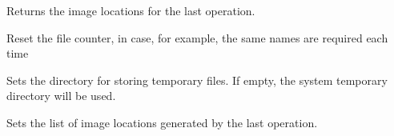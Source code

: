 \label{wxrichtexthtmlhandlergettemporaryimagelocations}


Returns the image locations for the last operation.

\label{wxrichtexthtmlhandlersetfilecounter}


Reset the file counter, in case, for example, the same names are required each time

\label{wxrichtexthtmlhandlersettempdir}


Sets the directory for storing temporary files. If empty, the system
temporary directory will be used.

\label{wxrichtexthtmlhandlersettemporaryimagelocations}


Sets the list of image locations generated by the last operation.

